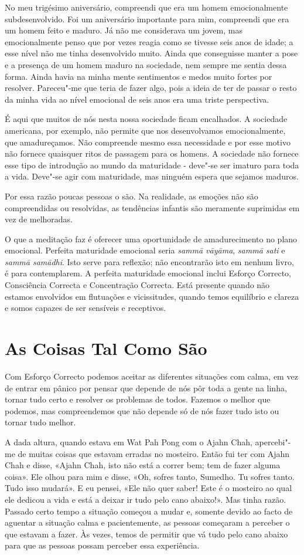 No meu trigésimo aniversário, compreendi que era um homem emocionalmente
subdesenvolvido. Foi um aniversário importante para mim, compreendi que era um
homem feito e maduro. Já não me considerava um jovem, mas emocionalmente penso
que por vezes reagia como se tivesse seis anos de idade; a esse nível não me
tinha desenvolvido muito. Ainda que conseguisse manter a pose e a presença de um
homem maduro na sociedade, nem sempre me sentia dessa forma. Ainda havia na
minha mente sentimentos e medos muito fortes por resolver. Pareceu"-me que teria
de fazer algo, pois a ideia de ter de passar o resto da minha vida ao nível
emocional de seis anos era uma triste perspectiva.

É aqui que muitos de nós nesta nossa sociedade ficam encalhados. A sociedade americana, por exemplo, não permite que nos desenvolvamos emocionalmente, que amadureçamos. Não compreende mesmo essa necessidade e por esse motivo não fornece quaisquer ritos de passagem para os homens. A sociedade não fornece esse tipo de introdução ao mundo da maturidade - deve"-se ser imaturo para toda a vida. Deve"-se agir com maturidade, mas ninguém espera que sejamos maduros.

Por essa razão poucas pessoas o são. Na realidade, as emoções não são
compreendidas ou resolvidas, as tendências infantis são meramente suprimidas em
vez de melhoradas.

O que a meditação faz é oferecer uma oportunidade de amadurecimento no plano
emocional. Perfeita maturidade emocional seria \emph{sammā vāyāma}, \emph{sammā
  sati} e \emph{sammā samādhi}. Isto serve para reflexão; não encontrarão isto
em nenhum livro, é para contemplarem. A perfeita maturidade emocional inclui
Esforço Correcto, Consciência Correcta e Concentração Correcta. Está presente quando
não estamos envolvidos em flutuações e vicissitudes, quando temos equilíbrio e
clareza e somos capazes de ser sensíveis e receptivos.

\section{As Coisas Tal Como São}

Com Esforço Correcto podemos aceitar as diferentes situações com calma, em vez
de entrar em pânico por pensar que depende de nós pôr toda a gente na linha,
tornar tudo certo e resolver os problemas de todos. Fazemos o melhor que
podemos, mas compreendemos que não depende só de nós fazer tudo isto ou tornar
tudo melhor.

A dada altura, quando estava em Wat Pah Pong com o Ajahn Chah, apercebi"-me de
muitas coisas que estavam erradas no mosteiro. Então fui ter com Ajahn Chah e disse,
«Ajahn Chah, isto não está a correr bem; tem de fazer alguma coisa». Ele olhou
para mim e disse, «Oh, sofres tanto, Sumedho. Tu sofres tanto. Tudo isso
mudará». E eu pensei, «Ele não quer saber! Este é o mosteiro ao qual ele dedicou
a vida e está a deixar ir tudo pelo cano abaixo!». Mas tinha razão. Passado
certo tempo a situação começou a mudar e, somente devido ao facto de aguentar a
situação calma e pacientemente, as pessoas começaram a perceber o que estavam a
fazer. Às vezes, temos de permitir que vá tudo pelo cano abaixo para que as
pessoas possam perceber essa experiência.

